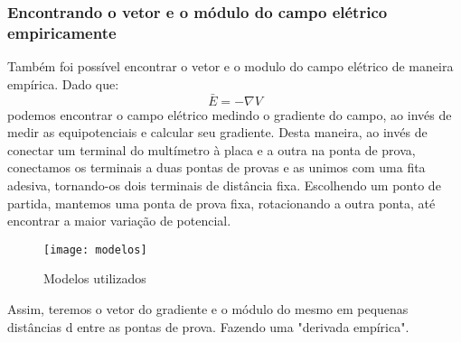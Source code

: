         \subsubsection{Encontrando o vetor e o módulo do campo elétrico empiricamente}
            Também foi possível encontrar o vetor e o modulo
            do campo elétrico de maneira empírica. Dado que: 
            $$\bar{E} = - \nabla V$$
            podemos encontrar o campo elétrico medindo o gradiente
            do campo, ao invés de medir as equipotenciais
            e calcular seu gradiente.
            \newline
            \newline
            Desta maneira, ao invés de conectar um terminal
            do multímetro à placa e a outra na ponta de prova,
            conectamos os terminais a duas pontas de provas 
            e as unimos com uma fita adesiva, tornando-os 
            dois terminais de distância fixa.
            \newline
            \newline
            Escolhendo um ponto de partida, mantemos uma 
            ponta de prova fixa, rotacionando a outra ponta, 
            até encontrar a maior variação de potencial. 
            \newline
            \begin{figure} [ht]
                \centering
                \texttt{[image: modelos]}
                \caption{Modelos utilizados}
                \label{fig:modelos}
            \end{figure}
            \newline
            Assim, teremos o vetor do gradiente e o módulo 
            do mesmo em pequenas distâncias d entre as pontas 
            de prova. Fazendo uma "derivada empírica".